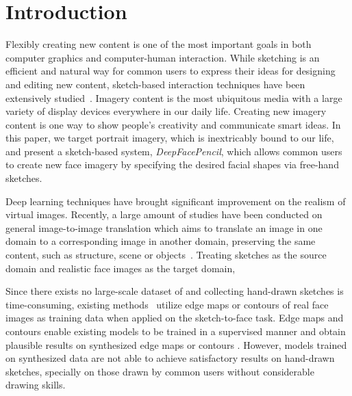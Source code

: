 
\section{Introduction}


Flexibly creating new content is one of the most important goals in both computer graphics and computer-human interaction. While sketching is an efficient and natural way for common users to express their ideas for designing and editing new content, sketch-based interaction techniques have been extensively studied~\cite{SutherlandSketchPad64,Zeleznik-Sketch96,Igarashi-teddy99,Chen_sketchingreality08,Chen09sketch2photo}. 
Imagery content is the most ubiquitous media with a large variety of display devices everywhere in our daily life. 
Creating new imagery content is one way to show people's creativity and communicate smart ideas.
%
In this paper, we target portrait imagery, which is inextricably bound to our life, and present a sketch-based system, \emph{DeepFacePencil}, which allows common users to create new face imagery by specifying the desired facial shapes via free-hand sketches. 

Deep learning techniques have brought significant improvement on the realism of virtual images. 
Recently, a large amount of studies have been conducted on general image-to-image translation which aims to translate an image in one domain to a corresponding image in another domain, preserving the same content, such as structure, scene or objects~\cite{pix2pix,pix2pixHD,CycleGANs,DiscoGANs, DualGANs,BicycleGANs}. 
%
Treating sketches as the source domain and realistic face images as the target domain, 


Since there exists no large-scale dataset of  and collecting hand-drawn sketches is time-consuming, existing methods~\cite{pix2pix, pix2pixHD, Lines2Face} utilize edge maps or contours of real face images as training data when applied on the sketch-to-face task. Edge maps and contours enable existing models to be trained in a supervised manner and obtain plausible results on synthesized edge maps or contours . 
%
However, models trained on synthesized data are not able to achieve satisfactory results on hand-drawn sketches, specially on those drawn by common users without considerable drawing skills. 

